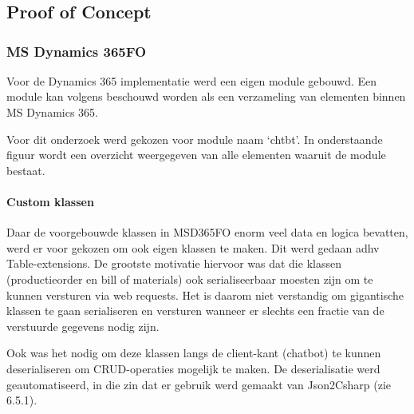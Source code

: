 
\chapter{}
\label{ch:methodologie}


\section{Proof of Concept}
\subsection{MS Dynamics 365FO}
Voor de Dynamics 365 implementatie werd een eigen module gebouwd. Een module kan volgens \textcite{Microsoft2019} beschouwd worden als een verzameling van elementen binnen MS Dynamics 365. 

Voor dit onderzoek werd gekozen voor module naam `chtbt'. In onderstaande figuur wordt een overzicht weergegeven van alle elementen waaruit de module bestaat. 

\subsubsection{Custom klassen}
Daar de voorgebouwde klassen in MSD365FO enorm veel data en logica bevatten, werd er voor gekozen om ook eigen klassen te maken. Dit werd gedaan adhv Table-extensions. De grootste motivatie hiervoor was dat die klassen (productieorder en bill of materials) ook serialiseerbaar moesten zijn om te kunnen versturen via web requests. Het is daarom niet verstandig om gigantische klassen te gaan serialiseren en versturen wanneer er slechts een fractie van de verstuurde gegevens nodig zijn. 

Ook was het nodig om deze klassen langs de client-kant (chatbot) te kunnen deserialiseren om CRUD-operaties mogelijk te maken. De deserialisatie werd geautomatiseerd, in die zin dat er gebruik werd gemaakt van Json2Csharp (zie 6.5.1). 

